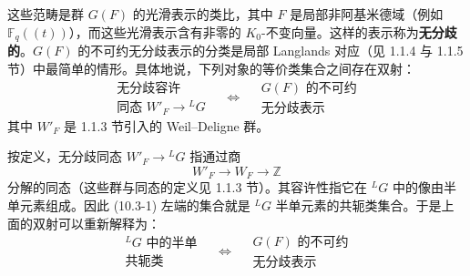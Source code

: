 这些范畴是群 $G(F)$ 的光滑表示的类比，其中 $F$ 是局部非阿基米德域（例如 $\mathbb{F}_q((t))$），而这些光滑表示含有非零的 $K_0$-不变向量。这样的表示称为\textbf{无分歧的}。$G(F)$ 的不可约无分歧表示的分类是局部 Langlands 对应（见 1.1.4 与 1.1.5 节）中最简单的情形。具体地说，下列对象的等价类集合之间存在双射：
\begin{equation}
    \boxed{\begin{array}{c}\text{无分歧容许}\\[-2pt]\text{同态 } W'_F\to{}^LG\end{array}}
    \quad\Longleftrightarrow\quad
    \boxed{\begin{array}{c}\text{$G(F)$ 的不可约}\\[-2pt]\text{无分歧表示}\end{array}}
    \tag{10.3-1}
\end{equation}
其中 $W'_F$ 是 1.1.3 节引入的 Weil--Deligne 群。


按定义，无分歧同态 $W'_F\to{}^LG$ 指通过商
\[
    W'_F\to W_F\to\mathbb{Z}
\]
分解的同态（这些群与同态的定义见 1.1.3 节）。其容许性指它在 ${}^LG$ 中的像由半单元素组成。因此 (10.3-1) 左端的集合就是 ${}^LG$ 半单元素的共轭类集合。于是上面的双射可以重新解释为：
\begin{equation}
    \boxed{\begin{array}{c}\text{${}^LG$ 中的半单}\\[-2pt]\text{共轭类}\end{array}}
    \quad\Longleftrightarrow\quad
    \boxed{\begin{array}{c}\text{$G(F)$ 的不可约}\\[-2pt]\text{无分歧表示}\end{array}}
    \tag{10.3-2}
\end{equation}

